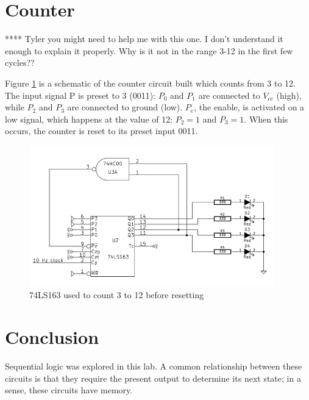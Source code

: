 \documentclass[11pt]{article}
\begin{document}
\section{Counter}

**** Tyler you might need to help me with this one. I don't understand it enough to explain it properly. Why is it not in the range 3-12 in the first few cycles??

Figure \ref{fig:counter} is a schematic of the counter circuit built which counts from 3 to 12. The input signal P is preset to 3 (0011): $P_0$ and $P_1$ are connected to $V_{cc}$ (high), while $P_2$ and $P_3$ are connected to ground (low). $P_e$, the enable, is activated on a low signal, which happens at the value of 12: $P_2 = 1$ and $P_3 = 1$. When this occurs, the counter is reset to its preset input 0011. 

\begin{figure}[htpb]
	\centering
	\includegraphics[width=0.95\textwidth]{schematic_counter}
	\caption{74LS163 used to count 3 to 12 before resetting}
	\label{fig:counter}
\end{figure}

\section{Conclusion}

Sequential logic was explored in this lab. A common relationship between these circuits is that they require the present output to determine its next state; in a sense, these circuits have memory.
\end{document}
